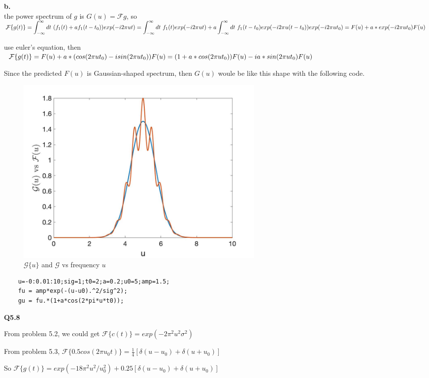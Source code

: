 \documentclass[12pt,a4paper]{article}
\newcommand{\infint}{\mathop{\mathlarger{\int_{-\infty}^\infty}}}
\begin{document}
    \textbf{b.}\\
    \noindent the power spectrum of $g$ is $G(u)=\mathcal{F}g$, so\\
    $\mathcal{F}\{g(t)\}=\infint dt\ (f_1(t)+af_1(t-t_0))exp(-i2\pi ut)\\
    =\infint dt\ f_1(t)exp(-i2\pi ut)+a\infint dt\ f_1(t-t_0)exp(-i2\pi u(t-t_0))exp(-i2\pi ut_0)\\
    =F(u)+a*exp(-i2\pi ut_0)F(u)$
    
    \noindent use euler's equation, then\\
    $\mathcal{F}\{g(t)\}=F(u)+a*(cos(2\pi ut_0)-isin(2\pi ut_0))F(u)\\
    =(1+a*cos(2\pi ut_0))F(u)-ia*sin(2\pi ut_0)F(u)$

    \vspace{0.5cm}
    \noindent Since the predicted $F(u)$ is Gaussian-shaped spectrum, then $G(u)$ woule be like this shape with the following code.\\
    \begin{figure}[!ht]
        \centering
        \includegraphics*[width=0.6\textwidth]{fig5.7.jpg}
        \caption{$\mathcal{G}\{u\}$ and $\mathcal{G}$ vs frequency $u$} 
    \end{figure} 

    \begin{lstlisting}
    u=-0:0.01:10;sig=1;t0=2;a=0.2;u0=5;amp=1.5;
    fu = amp*exp(-(u-u0).^2/sig^2);
    gu = fu.*(1+a*cos(2*pi*u*t0));
    \end{lstlisting}


    \newpage
    \Large{\textbf{Q5.8}}

    \noindent From problem 5.2, we could get $\mathcal{F}\{c(t)\}=exp(-2\pi^2u^2\sigma^2)$

    \noindent From problem 5.3, $\mathcal{F}\{0.5cos(2\pi u_0t)\}=\frac{1}{4}[\delta(u-u_0)+\delta(u+u_0)]$

    \noindent So $\mathcal{F}\{g(t)\}=exp(-18\pi^2u^2/u_0^2)+0.25[\delta(u-u_0) +\delta(u+u_0)]$
\end{document}
